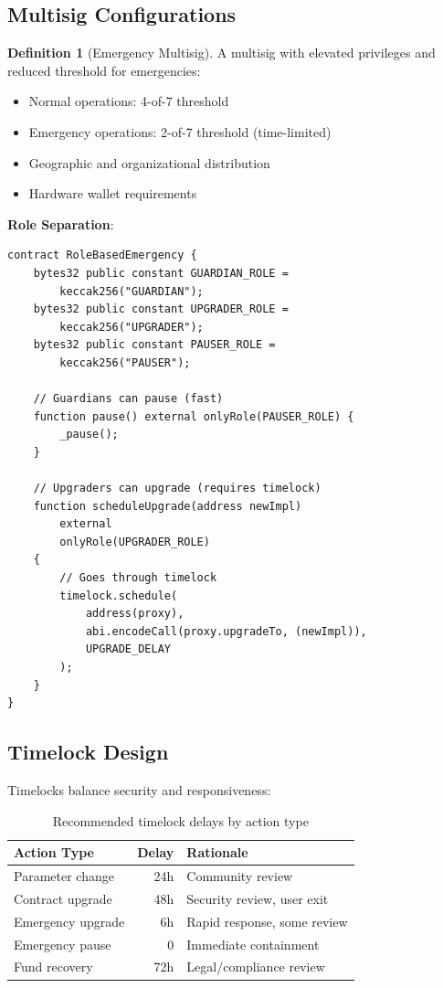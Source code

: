 \documentclass[11pt,a4paper]{article}
\theoremstyle{definition}
\newtheorem{definition}{Definition}
\begin{document}
\subsection{Multisig Configurations}

\begin{definition}[Emergency Multisig]
A multisig with elevated privileges and reduced threshold for emergencies:
\begin{itemize}
    \item Normal operations: 4-of-7 threshold
    \item Emergency operations: 2-of-7 threshold (time-limited)
    \item Geographic and organizational distribution
    \item Hardware wallet requirements
\end{itemize}
\end{definition}

\textbf{Role Separation}:
\begin{lstlisting}[language=Solidity,basicstyle=\ttfamily\small]
contract RoleBasedEmergency {
    bytes32 public constant GUARDIAN_ROLE =
        keccak256("GUARDIAN");
    bytes32 public constant UPGRADER_ROLE =
        keccak256("UPGRADER");
    bytes32 public constant PAUSER_ROLE =
        keccak256("PAUSER");

    // Guardians can pause (fast)
    function pause() external onlyRole(PAUSER_ROLE) {
        _pause();
    }

    // Upgraders can upgrade (requires timelock)
    function scheduleUpgrade(address newImpl)
        external
        onlyRole(UPGRADER_ROLE)
    {
        // Goes through timelock
        timelock.schedule(
            address(proxy),
            abi.encodeCall(proxy.upgradeTo, (newImpl)),
            UPGRADE_DELAY
        );
    }
}
\end{lstlisting}

\subsection{Timelock Design}

Timelocks balance security and responsiveness:

\begin{table}[h]
\centering
\begin{tabular}{lrp{5cm}}
\toprule
\textbf{Action Type} & \textbf{Delay} & \textbf{Rationale} \\
\midrule
Parameter change & 24h & Community review \\
Contract upgrade & 48h & Security review, user exit \\
Emergency upgrade & 6h & Rapid response, some review \\
Emergency pause & 0 & Immediate containment \\
Fund recovery & 72h & Legal/compliance review \\
\bottomrule
\end{tabular}
\caption{Recommended timelock delays by action type}
\end{table}
\end{document}
